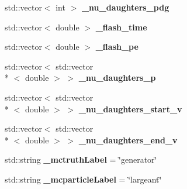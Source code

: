 \begin{DoxyCompactItemize}
\item 
\hypertarget{classlee_1_1ElectronNeutrinoFilter_aa8618e4d9a89d2a11a6a0e2f2587ee0b}{std\-::vector$<$ int $>$ {\bfseries \-\_\-nu\-\_\-daughters\-\_\-pdg}}\label{classlee_1_1ElectronNeutrinoFilter_aa8618e4d9a89d2a11a6a0e2f2587ee0b}

\item 
\hypertarget{classlee_1_1ElectronNeutrinoFilter_a2ee2c9440767e5421332fbe09a999b81}{std\-::vector$<$ double $>$ {\bfseries \-\_\-flash\-\_\-time}}\label{classlee_1_1ElectronNeutrinoFilter_a2ee2c9440767e5421332fbe09a999b81}

\item 
\hypertarget{classlee_1_1ElectronNeutrinoFilter_a597df779d0609b7ff9042f27fc10162e}{std\-::vector$<$ double $>$ {\bfseries \-\_\-flash\-\_\-pe}}\label{classlee_1_1ElectronNeutrinoFilter_a597df779d0609b7ff9042f27fc10162e}

\item 
\hypertarget{classlee_1_1ElectronNeutrinoFilter_adadc9f67a7081c711beb31212f756c7e}{std\-::vector$<$ std\-::vector\\*
$<$ double $>$ $>$ {\bfseries \-\_\-nu\-\_\-daughters\-\_\-p}}\label{classlee_1_1ElectronNeutrinoFilter_adadc9f67a7081c711beb31212f756c7e}

\item 
\hypertarget{classlee_1_1ElectronNeutrinoFilter_a7abfee2964d910a5caf074bc53389453}{std\-::vector$<$ std\-::vector\\*
$<$ double $>$ $>$ {\bfseries \-\_\-nu\-\_\-daughters\-\_\-start\-\_\-v}}\label{classlee_1_1ElectronNeutrinoFilter_a7abfee2964d910a5caf074bc53389453}

\item 
\hypertarget{classlee_1_1ElectronNeutrinoFilter_a7877ffa0e396de6907ed7dca3e5c5e1d}{std\-::vector$<$ std\-::vector\\*
$<$ double $>$ $>$ {\bfseries \-\_\-nu\-\_\-daughters\-\_\-end\-\_\-v}}\label{classlee_1_1ElectronNeutrinoFilter_a7877ffa0e396de6907ed7dca3e5c5e1d}

\item 
\hypertarget{classlee_1_1ElectronNeutrinoFilter_a7b91ab5f148464be875c2eb4438d091c}{std\-::string {\bfseries \-\_\-mctruth\-Label} = \char`\"{}generator\char`\"{}}\label{classlee_1_1ElectronNeutrinoFilter_a7b91ab5f148464be875c2eb4438d091c}

\item 
\hypertarget{classlee_1_1ElectronNeutrinoFilter_af903bbd240a90b34caeb1eddf5313642}{std\-::string {\bfseries \-\_\-mcparticle\-Label} = \char`\"{}largeant\char`\"{}}\label{classlee_1_1ElectronNeutrinoFilter_af903bbd240a90b34caeb1eddf5313642}

\end{DoxyCompactItemize}


